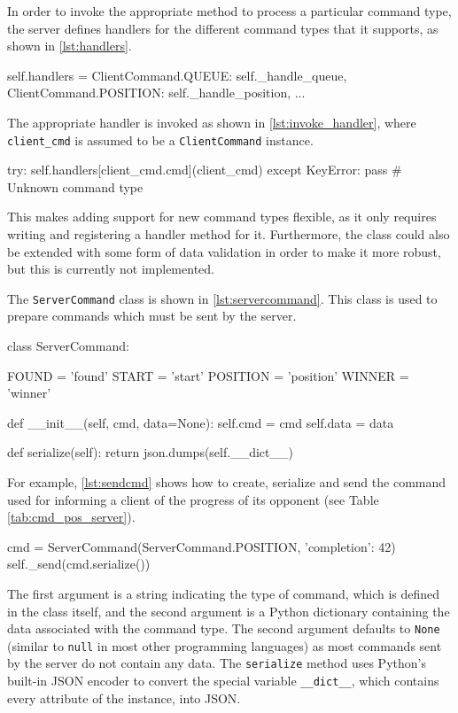 In order to invoke the appropriate method to process a particular command type, the server defines handlers for the different command types that it supports, as shown in \autoref{lst:handlers}.

\begin{code}[language={Python}, caption={Handlers for Different Command Types}, label={lst:handlers}]
self.handlers = {
		ClientCommand.QUEUE: self._handle_queue,
		ClientCommand.POSITION: self._handle_position,
		...
	}
\end{code}

The appropriate handler is invoked as shown in \autoref{lst:invoke_handler}, where \texttt{client\_cmd} is assumed to be a \texttt{Client\-Command} instance.

\begin{code}[language={Python}, caption={Invoking a Handler Method}, label={lst:invoke_handler}]
try:
	self.handlers[client_cmd.cmd](client_cmd)
except KeyError:
	pass # Unknown command type
\end{code}

This makes adding support for new command types flexible, as it only requires writing and registering a handler method for it.
Furthermore, the class could also be extended with some form of data validation in order to make it more robust, but this is currently not implemented.

The \texttt{Server\-Command} class is shown in \autoref{lst:servercommand}.
This class is used to prepare commands which must be sent by the server.

\begin{code}[language={Python}, caption={\texttt{ServerCommand} Class}, label={lst:servercommand}]
class ServerCommand:

	FOUND = 'found'
	START = 'start'
	POSITION = 'position'
	WINNER = 'winner'

	def __init__(self, cmd, data=None):
		self.cmd = cmd
		self.data = data

	def serialize(self):
		return json.dumps(self.__dict__)
\end{code}

For example, \autoref{lst:sendcmd} shows how to create, serialize and send the command used for informing a client of the progress of its opponent (see Table \vref{tab:cmd_pos_server}).

\begin{code}[language={Python}, caption={Creating and Sending a Command}, label={lst:sendcmd}]
cmd = ServerCommand(ServerCommand.POSITION, {'completion': 42})
self._send(cmd.serialize())
\end{code}

The first argument is a string indicating the type of command, which is defined in the class itself, and the second argument is a Python dictionary containing the data associated with the command type.
The second argument defaults to \texttt{None} (similar to \texttt{null} in most other programming languages) as most commands sent by the server do not contain any data.
The \texttt{serialize} method uses Python's built-in JSON encoder to convert the special variable \texttt{\_\_dict\_\_}, which contains every attribute of the instance, into JSON.
